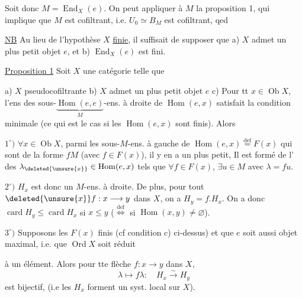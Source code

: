 Soit donc $M=\operatorname{End}_X(e)$. On peut appliquer à $M$ la proposition 1, qui implique que $M$ est cofiltrant, i.e. $U_0\simeq B_M$ est cofiltrant, qed

\uline{NB} Au lieu de l'hypothèse $X$ \uline{finie}, il suffisait de supposer que a) $X$ admet un plus petit objet $e$, et b) $\operatorname{End}_X(e)$ est fini.


\uline{Proposition 1} Soit $X$ une catégorie telle que

 a) $X$ pseudocofiltrante \quad b) $X$ admet un plus petit objet $e$   c) Pour tt $x\in\operatorname{Ob}X$, l'ens des sous-$\underbrace{\operatorname{Hom}(e,e)}_{M}$-ens. à droite de $\operatorname{Hom}(e,x)$ satisfait la condition minimale (ce qui est le cas si les $\operatorname{Hom}(e,x)$ sont finis). Alors

$1^\circ)$ $\forall x\in\operatorname{Ob}X$, parmi les sous-$M$-ens. à gauche de $\operatorname{Hom}(e,x)\overset{\mathrm{def}}=F(x)$ qui sont de la forme $fM$ (avec $f\in F(x)$), il y en a un plus petit,  Il est formé de l' des $\lambda_{\deleted{\unsure{x}}}\in\operatorname{Hom}(e,x)$   tels que  $\forall f\in F(x)$, $\exists u\in M$ avec $\lambda=fu$.

$2^\circ)$ $H_x$ est donc un $M$-ens. à droite. De plus, pour tout $\deleted{\unsure{x}}f:x\longrightarrow y$ dans $X$, on a $H_y=f.H_x$. On a donc $\operatorname{card} H_y\leq\operatorname{card} H_x$ si $x\leq y$ ($\overset{\mathrm{def}}\Longleftrightarrow$ si $\operatorname{Hom}(x,y)\ne\varnothing$).

$3^\circ)$ Supposons les $F(x)$ finis (cf condition c) ci-dessus) et que $e$ soit aussi objet maximal, i.e. que $\operatorname{Ord} X$ soit réduit


à un élément. Alors pour tte flèche $f:x\longrightarrow y$ dans $X$, 
\[
\lambda\longmapsto f\lambda:\quad H_x\overset{\sim}{\longrightarrow} H_y
\]
est bijectif, (i.e les $H_x$ forment un syst. local sur $X$).

